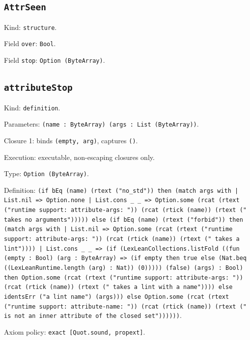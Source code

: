 \documentclass[11pt]{article}
\begin{document}
\subsection*{\texttt{AttrSeen}}
\noindent Kind: \texttt{structure}.\par
\noindent Field \texttt{over}: \texttt{Bool}.\par
\noindent Field \texttt{stop}: \texttt{Option (ByteArray)}.\par
\subsection*{\texttt{attributeStop}}
\noindent Kind: \texttt{definition}.\par
\noindent Parameters: \texttt{(name : ByteArray) (args : List (ByteArray))}.\par
\noindent Closure 1: binds \texttt{(empty, arg)}, captures \texttt{()}.\par
\noindent Execution: executable, non-escaping closures only.\par
\noindent Type: \texttt{Option (ByteArray)}.\par
\noindent Definition: \texttt{(if bEq (name) (rtext ("no\_std")) then (match args with | List.nil => Option.none | List.cons \_ \_ => Option.some (rcat (rtext ("runtime support: attribute-args: ")) (rcat (rtick (name)) (rtext (" takes no arguments"))))) else (if bEq (name) (rtext ("forbid")) then (match args with | List.nil => Option.some (rcat (rtext ("runtime support: attribute-args: ")) (rcat (rtick (name)) (rtext (" takes a lint")))) | List.cons \_ \_ => (if (LexLeanCollections.listFold ((fun (empty : Bool) (arg : ByteArray) => (if empty then true else (Nat.beq ((LexLeanRuntime.length (arg) : Nat)) (0))))) (false) (args) : Bool) then Option.some (rcat (rtext ("runtime support: attribute-args: ")) (rcat (rtick (name)) (rtext (" takes a lint with a name")))) else identsErr ("a lint name") (args))) else Option.some (rcat (rtext ("runtime support: attribute-name: ")) (rcat (rtick (name)) (rtext (" is not an inner attribute of the closed set"))))))}.\par
\noindent Axiom policy: \texttt{exact [Quot.sound, propext]}.\par
\end{document}
